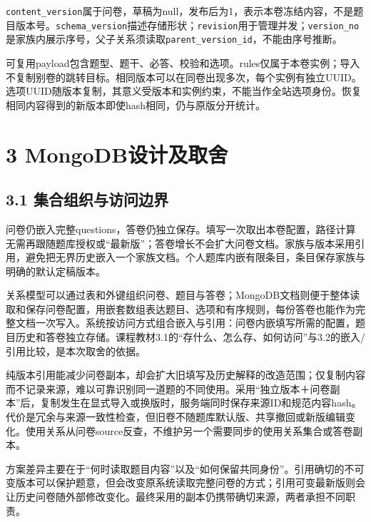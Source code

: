 \nolinkurl{content_version}属于问卷，草稿为null，发布后为1，表示本卷冻结内容，不是题目版本号。\nolinkurl{schema_version}描述存储形状；\nolinkurl{revision}用于管理并发；\nolinkurl{version_no}是家族内展示序号，父子关系须读取\nolinkurl{parent_version_id}，不能由序号推断。

可复用payload包含题型、题干、必答、校验和选项。rules仅属于本卷实例；导入不复制别卷的跳转目标。相同版本可以在同卷出现多次，每个实例有独立UUID。选项UUID随版本复制，其意义受版本和实例约束，不能当作全站选项身份。恢复相同内容得到的新版本即使hash相同，仍与原版分开统计。

\section{3 MongoDB设计及取舍}\label{mongodbux8bbeux8ba1ux53caux53d6ux820d}

\subsection{3.1 集合组织与访问边界}\label{ux96c6ux5408ux7ec4ux7ec7ux4e0eux8bbfux95eeux8fb9ux754c}

问卷仍嵌入完整questions，答卷仍独立保存。填写一次取出本卷配置，路径计算无需再跟随题库授权或``最新版''；答卷增长不会扩大问卷文档。家族与版本采用引用，避免把无界历史嵌入一个家族文档。个人题库内嵌有限条目，条目保存家族与明确的默认定稿版本。

关系模型可以通过表和外键组织问卷、题目与答卷；MongoDB文档则便于整体读取和保存问卷配置，用嵌套数组表达题目、选项和有序规则，每份答卷也能作为完整文档一次写入。系统按访问方式组合嵌入与引用：问卷内嵌填写所需的配置，题目历史和答卷独立存储。课程教材3.1的``存什么、怎么存、如何访问''与3.2的嵌入/引用比较，是本次取舍的依据。

纯版本引用能减少问卷副本，却会扩大旧填写及历史解释的改造范围；仅复制内容而不记录来源，难以可靠识别同一道题的不同使用。采用``独立版本＋问卷副本''后，复制发生在显式导入或换版时，服务端同时保存来源ID和规范内容hash。代价是冗余与来源一致性检查，但旧卷不随题库默认版、共享撤回或新版编辑变化。使用关系从问卷source反查，不维护另一个需要同步的使用关系集合或答卷副本。

方案差异主要在于``何时读取题目内容''以及``如何保留共同身份''。引用确切的不可变版本可以保护题意，但会改变原系统读取完整问卷的方式；引用可变最新版则会让历史问卷随外部修改变化。最终采用的副本仍携带确切来源，两者承担不同职责。

